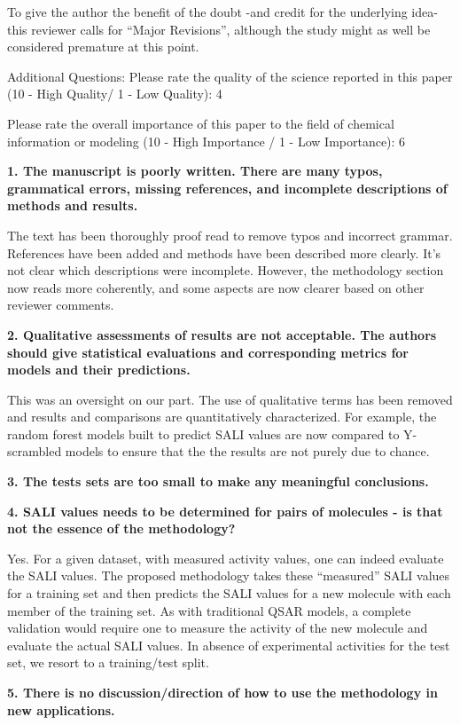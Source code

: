 \documentclass[letterpaper, 12pt]{article}
\begin{document}
To give the author the benefit of the doubt -and credit for the underlying idea- this reviewer calls for “Major Revisions”, although the study might as well be considered premature at this point. 

Additional Questions:
Please rate the quality of the science reported in this paper (10 - High Quality/ 1 - Low Quality): 4

Please rate the overall importance of this paper to the field of chemical information or modeling (10 - High Importance / 1 - Low Importance): 6


\textbf{1.  The manuscript is poorly written.  There are many typos, grammatical errors, missing
  references, and incomplete descriptions of methods and results.}

The text has been thoroughly proof read to remove typos and incorrect grammar. References have been
added and methods have been described more clearly. It's not clear which descriptions were
incomplete. However, the methodology section now reads more coherently, and some aspects are now
clearer based on other reviewer comments.

\textbf{2.  Qualitative assessments of results are not acceptable.  The authors should give
  statistical evaluations and corresponding metrics for models and their predictions.}

This was an oversight on our part. The use of qualitative terms has been removed and results and
comparisons are quantitatively characterized. For example,  the random forest models built to
predict SALI values are now compared to Y-scrambled models to ensure that the the results are not
purely due to chance. 

\textbf{3.  The tests sets are too small to make any meaningful conclusions.}

\textbf{4.  SALI values needs to be determined for pairs of molecules - is that not the essence of
  the methodology?}

Yes. For a given dataset, with measured activity values, one can indeed evaluate the SALI
values. The proposed methodology takes these ``measured'' SALI values for a training set and then
predicts the SALI values for a new molecule with each member of the training set. As with
traditional QSAR models, a complete validation would require one to measure the activity of the new
molecule and evaluate the actual SALI values. In absence of experimental activities for the test
set, we resort to a training/test split.

\textbf{5.  There is no discussion/direction of how to use the methodology in new applications.}
\end{document}
